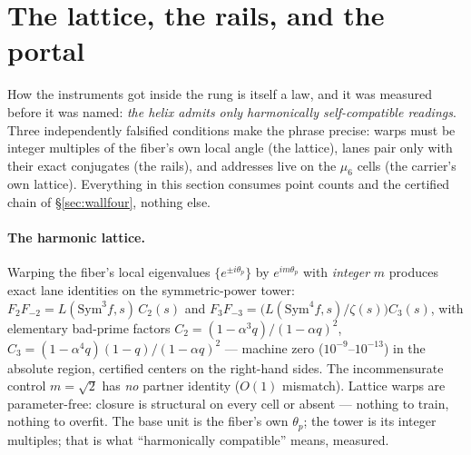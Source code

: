 \documentclass[11pt]{article}
\theoremstyle{definition}
\theoremstyle{remark}
\begin{document}
\section{The lattice, the rails, and the portal}\label{sec:rails}

How the instruments got inside the rung is itself a law, and it was measured
before it was named: \emph{the helix admits only harmonically self-compatible
readings}. Three independently falsified conditions make the phrase precise:
warps must be integer multiples of the fiber's own local angle (the lattice),
lanes pair only with their exact conjugates (the rails), and addresses live on
the $\mu_6$ cells (the carrier's own lattice). Everything in this section
consumes point counts and the certified chain of \S\ref{sec:wallfour}, nothing
else.

\paragraph{The harmonic lattice.} Warping the fiber's local eigenvalues
$\{e^{\pm i\theta_p}\}$ by $e^{im\theta_p}$ with \emph{integer} $m$ produces
exact lane identities on the symmetric-power tower:
$F_2F_{-2}=L(\mathrm{Sym}^3f,s)\,C_2(s)$ and
$F_3F_{-3}=\bigl(L(\mathrm{Sym}^4f,s)/\zeta(s)\bigr)C_3(s)$, with elementary
bad-prime factors $C_2=(1-\alpha^3q)/(1-\alpha q)^2$,
$C_3=(1-\alpha^4q)(1-q)/(1-\alpha q)^2$ --- machine zero
($10^{-9}$--$10^{-13}$) in the absolute region, certified centers on the
right-hand sides. The incommensurate control $m=\sqrt2$ has \emph{no} partner
identity ($O(1)$ mismatch). Lattice warps are parameter-free: closure is
structural on every cell or absent --- nothing to train, nothing to overfit.
The base unit is the fiber's own $\theta_p$; the tower is its integer
multiples; that is what ``harmonically compatible'' means, measured.
\end{document}
